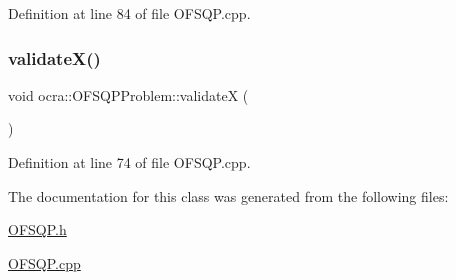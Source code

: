 Definition at line 84 of file O\+F\+S\+Q\+P.\+cpp.

\hypertarget{classocra_1_1OFSQPProblem_a4877a5ab95e85c32c32eca22d2db1147}{}\label{classocra_1_1OFSQPProblem_a4877a5ab95e85c32c32eca22d2db1147} 
\subsubsection{\texorpdfstring{validate\+X()}{validateX()}}
{\footnotesize\ttfamily void ocra\+::\+O\+F\+S\+Q\+P\+Problem\+::validateX (\begin{DoxyParamCaption}{ }\end{DoxyParamCaption})}



Definition at line 74 of file O\+F\+S\+Q\+P.\+cpp.



The documentation for this class was generated from the following files\+:\begin{DoxyCompactItemize}
\item 
\hyperlink{OFSQP_8h}{O\+F\+S\+Q\+P.\+h}\item 
\hyperlink{OFSQP_8cpp}{O\+F\+S\+Q\+P.\+cpp}\end{DoxyCompactItemize}
